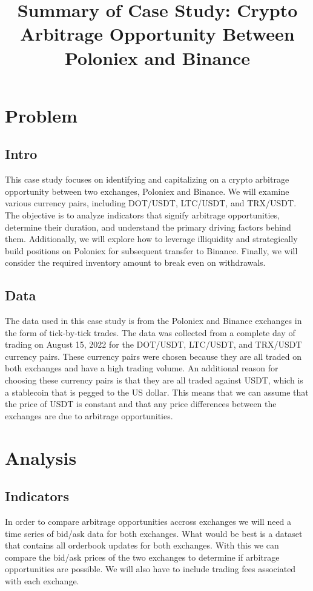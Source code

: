 \documentclass{article}
\begin{document}
\title{\textbf{Summary of Case Study: Crypto Arbitrage Opportunity Between Poloniex and Binance}}
\maketitle

\section{Problem}
\subsection{Intro}
This case study focuses on identifying and capitalizing on a crypto arbitrage opportunity between two exchanges, Poloniex and Binance. We will examine various currency pairs, including DOT/USDT, LTC/USDT, and TRX/USDT. The objective is to analyze indicators that signify arbitrage opportunities, determine their
duration, and understand the primary driving factors behind them. Additionally, we will explore how to
leverage illiquidity and strategically build positions on Poloniex for subsequent transfer to Binance. Finally,
we will consider the required inventory amount to break even on withdrawals.
\subsection{Data}
The data used in this case study is from the Poloniex and Binance exchanges in the form of tick-by-tick trades. The data was collected from a complete day of trading on August 15, 2022 for the DOT/USDT, LTC/USDT, and TRX/USDT currency pairs. These currency pairs were chosen because they are all traded on both exchanges and have a high trading volume. An additional reason for choosing these currency pairs is that they are all traded against USDT, which is a stablecoin that is pegged to the US dollar. This means that we can assume that the price of USDT is constant and that any price differences between the exchanges are due to arbitrage opportunities.

\newpage
\section{Analysis}
\subsection{Indicators}
In order to compare arbitrage opportunities accross exchanges we will need a time series of bid/ask data for both exchanges. What would be best is a dataset that contains all orderbook updates for both exchanges. With this we can compare the bid/ask prices of the two exchanges to determine if arbitrage opportunities are possible. We will also have to include trading fees associated with each exchange.
\end{document}
